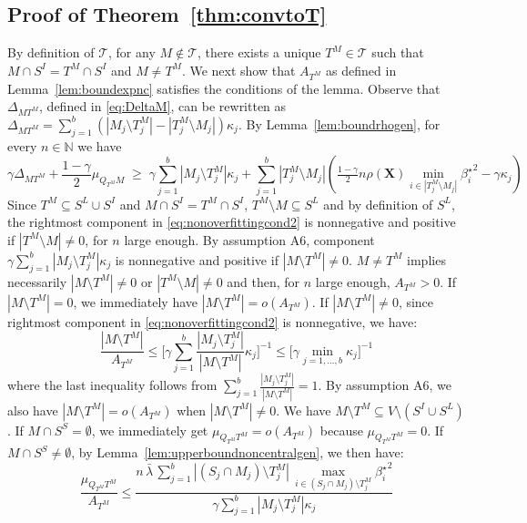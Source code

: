 \documentclass[aos]{imsart}
\theoremstyle{plain}
\newcommand{\N}{\mathbb{N}}
\newcommand{\T}{\mathcal{T}}
\newcommand{\bs}{\boldsymbol}
\begin{document}
\subsection{Proof of Theorem~\ref{thm:convtoT}}
By definition of $\T$, for any $M \not\in\T$, there exists a unique $T^M\in\T$ such that $M\cap S^I=T^M\cap S^I$ and $M\neq T^M$. We next show that $A_{T^M}$ as defined in Lemma~\ref{lem:boundexpnc} satisfies the conditions of the lemma. Observe that $\Delta_{MT^M}$, defined in \eqref{eq:DeltaM}, can be rewritten as $\Delta_{MT^M}=\sum_{j=1}^b(|M_j\setminus T^M_j|-|T^M_j\setminus M_j|)\kappa_j$. By  Lemma~\ref{lem:boundrhogen}, for every $n\in \N$ we have 
\begin{equation}\label{eq:nonoverfittingcond2}
   \gamma \Delta_{MT^M}+\frac{1-\gamma}{2}\mu_{Q_{T^M}M}\;\geq\; \gamma\sum_{j=1}^b|M_j \setminus T^M_j|\kappa_j + \sum_{j=1}^b |T^M_j\setminus M_j |\left(\tfrac{1-\gamma}{2} n \rho(\bs X) \min_{i\in |T^M_j\setminus M_j|}{\beta^{\star}_i}^{2} - \gamma\kappa_j\right) 
\end{equation} 
Since $T^M \subseteq S^L \cup S^I$ and $M\cap S^I=T^M\cap S^I$, $T^M\setminus M \subseteq S^L$ and by definition of $S^L$, the rightmost component in \eqref{eq:nonoverfittingcond2} is nonnegative and positive if $|T^M\setminus M|\neq0$, for $n$ large enough. By assumption A6, component $\gamma\sum_{j=1}^b|M_j \setminus T^M_j|\kappa_j$ is nonnegative and positive if $|M\setminus T^M|\neq0$.  $M\neq T^M$ implies necessarily $|M\setminus T^M|\neq0$ or $|T^M\setminus M|\neq0$ and then, for $n$ large enough, $A_{T^M}>0$. If $|M\setminus T^M|=0$, we immediately have $|M\setminus T^M|=o(A_{T^M})$. If $|M\setminus T^M|\neq 0$, since rightmost component in \eqref{eq:nonoverfittingcond2} is nonnegative, we have:
$$\frac{|M\setminus T^M|}{A_{T^M}}\leq \bigg[ \gamma\sum_{j=1}^b\frac{|M_j \setminus T^M_j|}{|M\setminus T^M|}\kappa_j \bigg]^{-1} \leq \bigg[ \gamma\min_{j=1,\ldots,b}\kappa_j \bigg]^{-1} $$
where the last inequality follows from $\sum_{j=1}^b\frac{|M_j \setminus T^M_j|}{|M\setminus T^M|}=1$. By assumption A6, we also have $|M\setminus T^M|=o(A_{T^M})$ when $|M\setminus T^M|\neq 0$. 
We have $M\setminus T^M\subseteq V\setminus (S^I \cup S^L)$. If $M\cap S^S=\emptyset$, we immediately get $\mu_{Q_{T^M} T^M}=o(A_{T^M})$ because $\mu_{Q_{T^M} T^M}=0$. If $M\cap S^S\neq\emptyset$, by Lemma~\ref{lem:upperboundnoncentralgen}, we then have:
$$\frac{\mu_{Q_{T^M} T^M}}{ A_{T^M}} \leq \frac{n\,\bar{\lambda}\,\sum_{j=1}^b|(S_j\cap M_j )\setminus T^M_j|\,\max_{i\in (S_j\cap M_j )\setminus T^M_j}{\beta_{i}^{\star}}^2}{ \gamma\sum_{j=1}^b|M_j \setminus T^M_j|\kappa_j}$$
\end{document}
